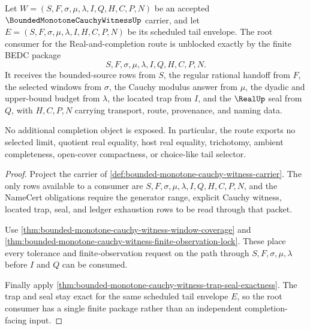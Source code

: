 \begin{theorem}
\label{thm:bounded-monotone-cauchy-witness-root-unblock}
Let $W=(S,F,\sigma,\mu,\lambda,I,Q,H,C,P,N)$ be an accepted $\BoundedMonotoneCauchyWitnessUp$ carrier, and let $E=(S,F,\sigma,\mu,\lambda,I,H,C,P,N)$ be its scheduled tail envelope. The root consumer for the Real-and-completion route is unblocked exactly by the finite BEDC package
$$
S,F,\sigma,\mu,\lambda,I,Q,H,C,P,N.
$$
It receives the bounded-source rows from $S$, the regular rational handoff from $F$, the selected windows from $\sigma$, the Cauchy modulus answer from $\mu$, the dyadic and upper-bound budget from $\lambda$, the located trap from $I$, and the $\RealUp$ seal from $Q$, with $H,C,P,N$ carrying transport, route, provenance, and naming data.

No additional completion object is exposed. In particular, the route exports no selected limit, quotient real equality, host real equality, trichotomy, ambient completeness, open-cover compactness, or choice-like tail selector.
\end{theorem}
\begin{proof}
Project the carrier of \autoref{def:bounded-monotone-cauchy-witness-carrier}. The only rows available to a consumer are $S,F,\sigma,\mu,\lambda,I,Q,H,C,P,N$, and the NameCert obligations require the generator range, explicit Cauchy witness, located trap, seal, and ledger exhaustion rows to be read through that packet.

Use \autoref{thm:bounded-monotone-cauchy-witness-window-coverage} and \autoref{thm:bounded-monotone-cauchy-witness-finite-observation-lock}. These place every tolerance and finite-observation request on the path through $S,F,\sigma,\mu,\lambda$ before $I$ and $Q$ can be consumed.

Finally apply \autoref{thm:bounded-monotone-cauchy-witness-trap-seal-exactness}. The trap and seal stay exact for the same scheduled tail envelope $E$, so the root consumer has a single finite package rather than an independent completion-facing input.
\end{proof}


